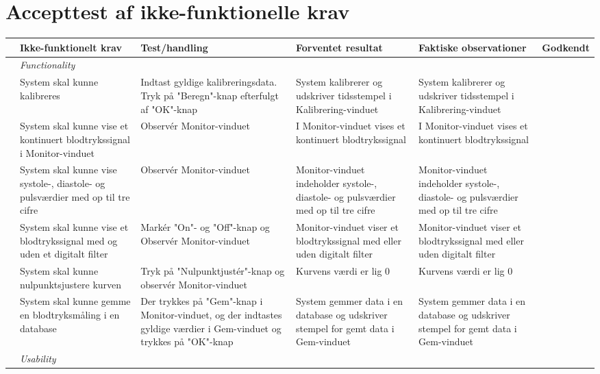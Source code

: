 \section{Accepttest af ikke-funktionelle krav}

\begin{longtabu} to 
	& Ikke-funktionelt krav & Test/handling & Forventet resultat & Faktiske observationer & Godkendt
	\\[-1ex] \midrule
	&  \textit{Functionality} &  &  & & \\ \midrule
	& System skal kunne kalibreres & Indtast gyldige kalibreringsdata. Tryk på "Beregn"\--knap efterfulgt af "OK"\--knap & System kalibrerer og udskriver tidsstempel i Kalibrering-vinduet & System kalibrerer og udskriver tidsstempel i Kalibrering-vinduet & {\Huge \checkmark}
	\\ \midrule
	& System skal kunne vise et kontinuert blodtrykssignal i Monitor-vinduet & Observér Monitor-vinduet & I Monitor-vinduet vises et kontinuert blodtrykssignal &  I Monitor-vinduet vises et kontinuert blodtrykssignal & {\Huge \checkmark}
	\\ \midrule
	& System skal kunne vise systole-, diastole- og pulsværdier med op til tre cifre & Observér Monitor-vinduet & Monitor-vinduet indeholder systole-, diastole- og pulsværdier med op til tre cifre & Monitor-vinduet indeholder systole-, diastole- og pulsværdier med op til tre cifre & {\Huge \checkmark}
	\\ \midrule
	& System skal kunne vise et blodtrykssignal med og uden et digitalt filter & Markér "On"- og "Off"\--knap og Observér Monitor-vinduet & Monitor-vinduet viser et blodtrykssignal med eller uden digitalt filter & Monitor-vinduet viser et blodtrykssignal med eller uden digitalt filter & {\Huge \checkmark}
	\\ \midrule
	& System skal kunne nulpunktsjustere kurven & Tryk på "Nulpunktjustér"\--knap og observér Monitor-vinduet & Kurvens værdi er lig 0 & Kurvens værdi er lig 0 & {\Huge \checkmark}
	\\ \midrule
	& System skal kunne gemme en blodtryksmåling i en database & Der trykkes på "Gem"\--knap i Monitor-vinduet, og der indtastes gyldige værdier i Gem-vinduet og trykkes på "OK"\--knap & System gemmer data i en database og udskriver stempel for gemt data i Gem-vinduet & System gemmer data i en database og udskriver stempel for gemt data i Gem-vinduet & {\Huge \checkmark}
	\\ \midrule
	& \textit{Usability} &  &  & & \\ \midrule

\end{longtabu}
